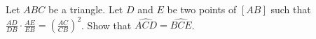 Let $ABC$ be a triangle. Let $D$ and $E$ be two points of $[AB]$ such that $\frac{AD}{DB} \cdot \frac{AE}{EB} = \left(\frac{AC}{CB}\right)^2$. Show that $\widehat{ACD} = \widehat{BCE}$.
